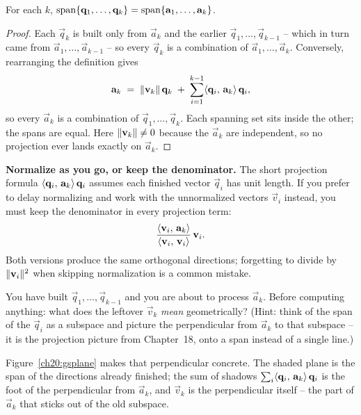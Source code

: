 \begin{proposition}
\label{ch20:span-prop}
For each $k$, $\operatorname{span}\{\mathbf{q}_1,\dots,\mathbf{q}_k\}=\operatorname{span}\{\mathbf{a}_1,\dots,\mathbf{a}_k\}$.
\end{proposition}

\begin{proof}
Each $\vec{q}_k$ is built only from $\vec{a}_k$ and the earlier
$\vec{q}_1,\dots,\vec{q}_{k-1}$ -- which in turn came from $\vec{a}_1,\dots,\vec{a}_{k-1}$
-- so every $\vec{q}_k$ is a combination of $\vec{a}_1,\dots,\vec{a}_k$. Conversely,
rearranging the definition gives
\[
  \mathbf{a}_k \;=\; \lVert\mathbf{v}_k\rVert\,\mathbf{q}_k \;+\; \sum_{i=1}^{k-1}\langle \mathbf{q}_i,\, \mathbf{a}_k \rangle\,\mathbf{q}_i,
\]
so every $\vec{a}_k$ is a combination of $\vec{q}_1,\dots,\vec{q}_k$. Each spanning set
sits inside the other; the spans are equal. Here $\lVert\mathbf{v}_k\rVert\neq 0$ because the
$\vec{a}_k$ are independent, so no projection ever lands exactly on $\vec{a}_k$.
\end{proof}

\begin{trapbox}
\textbf{Normalize as you go, or keep the denominator.} The short projection formula
$\langle \mathbf{q}_i,\, \mathbf{a}_k \rangle\,\mathbf{q}_i$ assumes each finished vector $\vec{q}_i$ has
unit length. If you prefer to delay normalizing and work with the unnormalized vectors
$\vec{v}_i$ instead, you must keep the denominator in every projection term:
\[
  \frac{\langle \mathbf{v}_i,\, \mathbf{a}_k \rangle}{\langle \mathbf{v}_i,\, \mathbf{v}_i \rangle}\,\mathbf{v}_i .
\]
Both versions produce the same orthogonal directions; forgetting
to divide by $\lVert\mathbf{v}_i\rVert^2$ when skipping normalization is a common mistake.
\end{trapbox}

\begin{walkbox}
You have built $\vec{q}_1,\dots,\vec{q}_{k-1}$ and you are about to process
$\vec{a}_k$. Before computing anything: what does the leftover $\vec{v}_k$ \emph{mean}
geometrically? (Hint: think of the span of the $\vec{q}_i$ as a subspace and picture the
perpendicular from $\vec{a}_k$ to that subspace -- it is the projection picture
from Chapter~18, onto a span instead of a single line.)
\end{walkbox}

Figure~\ref{ch20:gsplane} makes that perpendicular concrete. The shaded plane is the
span of the directions already finished; the sum of shadows
$\sum_i \langle \mathbf{q}_i,\, \mathbf{a}_k \rangle\,\mathbf{q}_i$ is the foot of the perpendicular from
$\vec{a}_k$, and $\vec{v}_k$ is the perpendicular itself -- the part of $\vec{a}_k$ that
sticks out of the old subspace.

